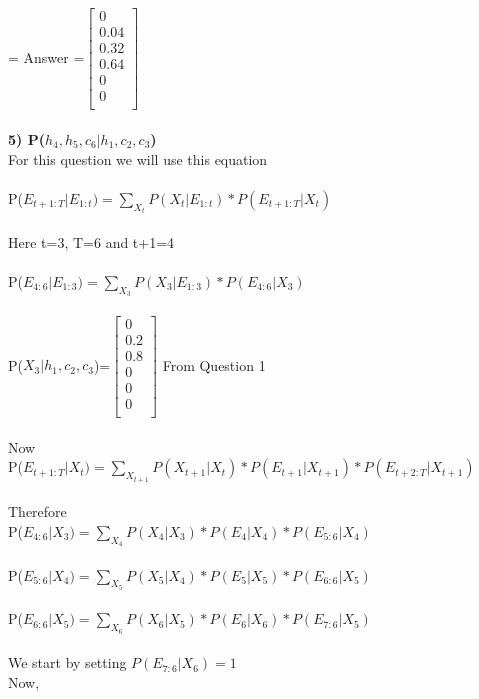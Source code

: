 \documentclass[11pt,a4paper]{article}
\begin{document}
\\\\
= Answer =$\begin{bmatrix}
0\\
0.04\\
0.32\\
0.64\\
0\\
0\\
\end{bmatrix}$
\\\\
\newpage
\textbf{5) P($h_{4}, h_{5}, c_{6}|h_{1},c_{2},c_{3}$)\\}
For this question we will use this equation\\\\
P($E_{t+1:T}|E_{1:t})=\sum_{X_{t}}P(X_{t}|E_{1:t})*P(E_{t+1:T}|X_{t})$\\\\
Here t=3, T=6  and t+1=4\\\\
P($E_{4:6}|E_{1:3})=\sum_{X_{3}}P(X_{3}|E_{1:3})*P(E_{4:6}|X_{3})$\\\\
P($X_{3}| h_{1}, c_{2},c_{3}$)=$\begin{bmatrix}
0\\
0.2\\
0.8\\
0\\
0\\
0\\
\end{bmatrix}$    From Question 1\\\\
Now\\
P($E_{t+1:T}|X_{t})=\sum_{X_{t+1}}P(X_{t+1}|X_{t})*P(E_{t+1}|X_{t+1})*P(E_{t+2:T}|X_{t+1})$\\\\
Therefore \\
P($E_{4:6}|X_{3})=\sum_{X_{4}}P(X_{4}|X_{3})*P(E_{4}|X_{4})*P(E_{5:6}|X_{4})$\\\\
P($E_{5:6}|X_{4})=\sum_{X_{5}}P(X_{5}|X_{4})*P(E_{5}|X_{5})*P(E_{6:6}|X_{5})$\\\\
P($E_{6:6}|X_{5})=\sum_{X_{6}}P(X_{6}|X_{5})*P(E_{6}|X_{6})*P(E_{7:6}|X_{5})$\\\\
We start by setting $P(E_{7:6}|X_{6})=1$\\
Now, \\
\end{document}
